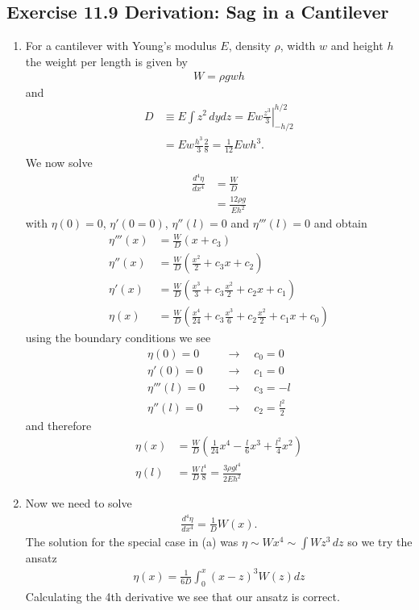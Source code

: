 \documentclass[../main.tex]{subfiles}
\begin{document}
\subsection{Exercise 11.9 Derivation: Sag in a Cantilever}
\begin{enumerate}[label=(\alph*)]
\item For a cantilever with Young's modulus $E$, density $\rho$, width $w$ and height $h$ the weight per length is given by
\begin{align}
    W=\rho g w h
\end{align}
and
\begin{align}
    D&\equiv E\int z^2\,dydz=Ew \left.\frac{z^3}{3}\right|_{-h/2}^{h/2}\\
    &=Ew\frac{h^3}{3}\frac{2}{8}=\frac{1}{12}Ewh^3.
\end{align}
We now solve
\begin{align}
    \frac{d^4\eta}{dx^4}
    &=\frac{W}{D}\\
    &=\frac{12\rho g}{Eh^2}
\end{align}
with $\eta(0)=0$, $\eta'(0=0)$, $\eta''(l)=0$ and $\eta'''(l)=0$ and obtain
\begin{align}
    \eta'''(x)&=\frac{W}{D}\left(x+c_3\right)\\
    \eta''(x)&=\frac{W}{D}\left(\frac{x^2}{2}+c_3x+c_2\right)\\
    \eta'(x)&=\frac{W}{D}\left(\frac{x^3}{3}+c_3\frac{x^2}{2}+c_2x +c_1\right)\\
    \eta(x)&=\frac{W}{D}\left(\frac{x^4}{24}+c_3\frac{x^3}{6}+c_2\frac{x^2}{2} +c_1x+c_0\right)
\end{align}
using the boundary conditions we see
\begin{align}
    \eta(0)=0    \quad&\rightarrow\quad c_0=0\\
    \eta'(0)=0   \quad&\rightarrow\quad c_1=0\\
    \eta'''(l)=0 \quad&\rightarrow\quad c_3=-l\\
    \eta''(l)=0  \quad&\rightarrow\quad c_2=\frac{l^2}{2}
\end{align}
and therefore
\begin{align}
    \eta(x)&=\frac{W}{D}\left(\frac{1}{24}x^4-\frac{l}{6}x^3+\frac{l^2}{4}x^2\right)\\
    \eta(l)&=\frac{W}{D}\frac{l^4}{8}=\frac{3\rho gl^4}{2Eh^2}
\end{align}

\item Now we need to solve
\begin{align}
    \frac{d^4\eta}{dx^4}=\frac{1}{D}W(x).
\end{align}
The solution for the special case in (a) was $\eta\sim W x^4\sim\int W z^3\,dz$ so we try the ansatz
\begin{align}
    \eta(x)=\frac{1}{6D}\int_0^x(x-z)^3W(z)dz
\end{align}
Calculating the 4th derivative we see that our ansatz is correct.


\end{enumerate}
\end{document}
